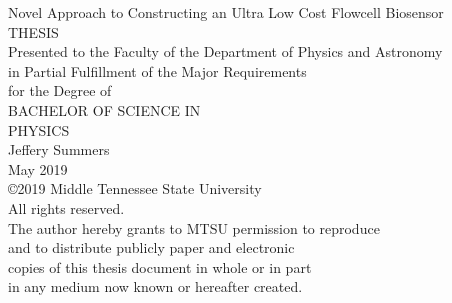 \documentclass{article}%
\begin{document}
\pagestyle{empty}
\begin{center}
{\Large\selectfont
    Novel Approach to Constructing an Ultra Low Cost Flowcell Biosensor\\
}
\vspace{1.7cm}
{\large\selectfont
    THESIS\\
}
\vspace{2cm}
{\large\selectfont
    Presented to the Faculty of the Department of Physics and Astronomy\\
    in Partial Fulfillment of the Major Requirements\\
    for the Degree of\\
}
\vspace{2.1cm}
{\large\selectfont
    BACHELOR OF SCIENCE IN\\
    PHYSICS\\
}
\vspace{2cm}
{\selectfont
    \large{Jeffery Summers}\\
}
\vspace{1.6cm}
{\selectfont
    \large{May 2019}\\
}
\vspace{2cm}
{\selectfont
    \copyright 2019 Middle Tennessee State University\\
    All rights reserved.\\
}
\vspace{0.2cm}
{\small\selectfont
    The author hereby grants to MTSU permission to reproduce\\
    and to distribute publicly paper and electronic\\
    copies of this thesis document in whole or in part\\
    in any medium now known or hereafter created.\\
}
\end{center}

\pagebreak
\end{document}
